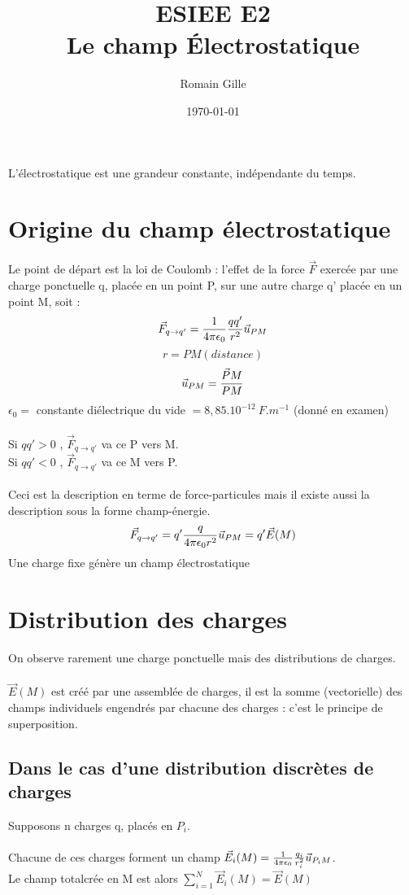 \documentclass[11pt,a4paper,french]{article}
\title{ESIEE E2 \\Le champ Électrostatique}
\author{Romain Gille}
\date{\today}
\begin{document}
\maketitle
\newpage
L'électrostatique est une grandeur constante, indépendante du temps.
\section{Origine du champ électrostatique}
Le point de départ est la loi de Coulomb : l'effet de la force $\vec F$ exercée par une charge ponctuelle q, placée en un point P, sur une autre charge q' placée en un point M, soit : 
$$\vec F_{q \rightarrow q'} = {1 \over {4 \pi \epsilon_0}} {qq' \over r^2} \vec u_{PM}$$
$$r = PM(distance)$$
$$\vec u_{PM} = {\vec PM \over PM}$$
$\epsilon_0 = $ constante diélectrique du vide $ = 8,85.10^{-12}~ F.m^{-1}$ (donné en examen) \\ \\
Si $qq'>0$ , $\vec F_{q\rightarrow q'}$ va ce P vers M.\\
Si $qq'<0$ , $\vec F_{q\rightarrow q'}$ va ce M vers P. \\ \\
Ceci est la description en terme de force-particules mais il existe aussi la description sous la forme champ-énergie.
$$\vec F_{q \rightarrow q'} = q' {q \over 4 \pi \epsilon_0 r^2}\vec u_{PM}=q' \vec E(M)$$
Une charge fixe génère un champ électrostatique
\newpage
\section{Distribution des charges}
On observe rarement une charge ponctuelle mais des distributions de charges. \\ \\
$\vec E(M)$ est créé par une assemblée de charges, il est la somme (vectorielle) des champs individuels engendrés par chacune des charges : c'est le principe de superposition.
\subsection{Dans le cas d'une distribution discrètes de charges}
Supposons n charges q, placés en $P_i$. \\ \\
Chacune de ces charges forment un champ $\vec E_i(M)= {1 \over {4 \pi \epsilon_0}} {q_i \over r_i^2} \vec u_{P_i M}$. \\
Le champ totalcrée en M est alors $\displaystyle\sum_{i=1}^{N} \vec E_i(M) = \vec E(M)$
\end{document}
